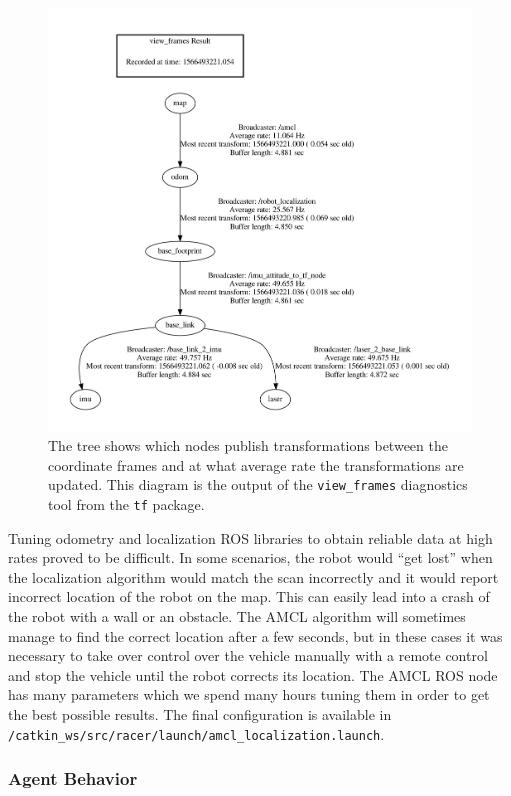 \begin{figure}
	\centering
	\includegraphics[width=125mm]{../img/racing_tf_tree.pdf}
	\caption{The tree shows which nodes publish transformations between the coordinate frames and at what average rate the transformations are updated. This diagram is the output of the \texttt{view\_frames} diagnostics tool from the \texttt{tf} package.}
	\label{fig:tf_tree_racing}
\end{figure}

Tuning odometry and localization ROS libraries to obtain reliable data at high rates proved to be difficult. In some scenarios, the robot would ``get lost'' when the localization algorithm would match the scan incorrectly and it would report incorrect location of the robot on the map. This can easily lead into a crash of the robot with a wall or an obstacle. The \gls*{AMCL} algorithm will sometimes manage to find the correct location after a few seconds, but in these cases it was necessary to take over control over the vehicle manually with a remote control and stop the vehicle until the robot corrects its location. The \gls*{AMCL} \gls*{ROS} node has many parameters which we spend many hours tuning them in order to get the best possible results. The final configuration is available in \newline\verb|/catkin_ws/src/racer/launch/amcl_localization.launch|.

\subsubsection{Agent Behavior}
\label{sec:agent_impl}


